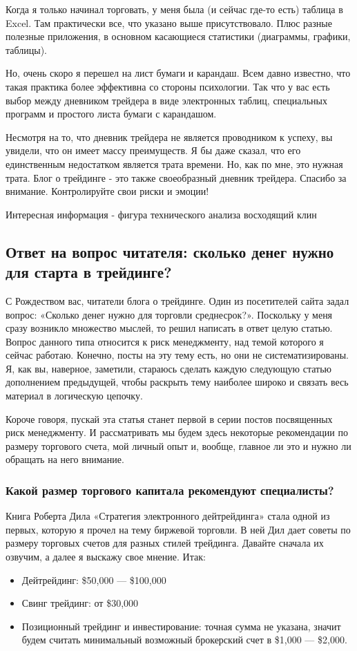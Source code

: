 \documentclass[a5paper]{article}
\begin{document}
Когда я только начинал торговать, у меня была (и сейчас где-то есть) таблица в Excel. Там практически все, что указано выше присутствовало. Плюс разные полезные приложения, в основном касающиеся статистики (диаграммы, графики, таблицы).

Но, очень скоро я перешел на лист бумаги и карандаш. Всем давно известно, что такая практика более эффективна со стороны психологии. Так что у вас есть выбор между дневником трейдера в виде электронных таблиц, специальных программ и простого листа бумаги с карандашом.

Несмотря на то, что дневник трейдера не является проводником к успеху, вы увидели, что он имеет массу преимуществ. Я бы даже сказал, что его единственным недостатком является трата времени. Но, как по мне, это нужная трата. Блог о трейдинге - это также своеобразный дневник трейдера. Спасибо за внимание. Контролируйте свои риски и эмоции!



Интересная информация - фигура технического анализа восходящий клин

\subsection{Ответ на вопрос читателя: сколько денег нужно для старта в
  трейдинге?}

С Рождеством вас, читатели блога о трейдинге. Один из посетителей сайта задал вопрос: «Сколько денег нужно для торговли среднесрок?». Поскольку у меня сразу возникло множество мыслей, то решил написать в ответ целую статью. Вопрос данного типа относится к риск менеджменту, над темой которого я сейчас работаю. Конечно, посты на эту тему есть, но они не систематизированы. Я, как вы, наверное, заметили, стараюсь сделать каждую следующую статью дополнением предыдущей, чтобы раскрыть тему наиболее широко и связать весь материал в логическую цепочку.

Короче говоря, пускай эта статья станет первой в серии постов
посвященных риск менеджменту. И рассматривать мы будем здесь некоторые
рекомендации по размеру торгового счета, мой личный опыт и, вообще,
главное ли это и нужно ли обращать на него внимание.

\subsubsection{Какой размер торгового капитала рекомендуют
  специалисты?}

Книга Роберта Дила «Стратегия электронного дейтрейдинга» стала одной из первых, которую я прочел на тему биржевой торговли. В ней Дил дает советы по размеру торговых счетов для разных стилей трейдинга. Давайте сначала их озвучим, а далее я выскажу свое мнение. Итак:
\begin{itemize}
\item     Дейтрейдинг: \$50,000 — \$100,000
\item     Свинг трейдинг: от \$30,000
\item     Позиционный трейдинг и инвестирование: точная сумма не указана, значит будем считать минимальный возможный брокерский счет в \$1,000 — \$2,000.
\end{itemize}
\end{document}
